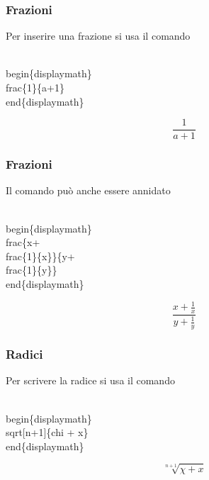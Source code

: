 \documentclass[svgnames,%
	ucs,%
	pdftex]{guitbeamer}
\begin{document}
\begin{frame}
  \frametitle{Frazioni}
	Per inserire una frazione si usa il comando 
	\begin{LaTeXcode}
		\\begin\{displaymath\}\n
		\hspace*{5ex}\alert{\\frac\{1\}\{a+1\}}\n
		\\end\{displaymath\}
	\end{LaTeXcode}
	\begin{LaTeXoutput}
		\begin{displaymath}
			\frac{1}{a+1}
		\end{displaymath}
	\end{LaTeXoutput}
\end{frame}
\begin{frame}
  \frametitle{Frazioni}
	Il comando  pu\`o anche essere annidato
	\begin{LaTeXcode}
		\\begin\{displaymath\}\n
		\hspace*{5ex}\alert{\\frac}\{x+\alert{\\frac\{1\}\{x\}}\}\{y+\alert{\\frac\{1\}\{y\}}\}\n
		\\end\{displaymath\}
	\end{LaTeXcode}
	\begin{LaTeXoutput}
		\begin{displaymath}
			\frac{x+\frac{1}{x}}{y+\frac{1}{y}}
		\end{displaymath}
	\end{LaTeXoutput}
\end{frame}
\begin{frame}
  \frametitle{Radici}
	Per scrivere la radice si usa il comando \LCmd{sqrt}
 	\begin{LaTeXcode}
		\\begin\{displaymath\}\n
		\hspace*{5ex}\alert{\\sqrt}[n+1]\{\bs chi + x\}\n
		\\end\{displaymath\}
 	\end{LaTeXcode}
	\begin{LaTeXoutput}
		\begin{displaymath}
			\sqrt[n+1]{\chi + x}
		\end{displaymath}
	\end{LaTeXoutput}
\end{frame}
\end{document}
